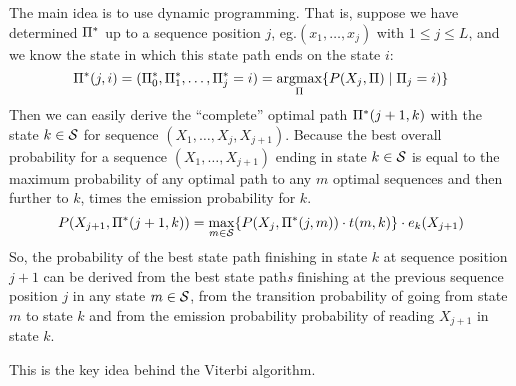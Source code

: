 The main idea is to use dynamic programming.  That is, suppose we have
determined \(\Pi^*\) up to a sequence position \(j\), eg.\@ \((x_1,\dotsc,x_j)\)
with \(1\leq j\leq L\), and we know the state in which this state path ends on
the state \(i\):
\[
    \Pi^*(j,i) = (\Pi_0^*, \Pi_1^*, \dotsc, \Pi_j^* = i)
                 = \operatorname*{argmax}_{\Pi} \{ P(X_j,\Pi) \mid \Pi_j = i) \}
\]
Then we can easily derive the \enquote{complete} optimal path \(\Pi^*(j+1,k)\)
with the state \(k\in\mathcal{S}\) for sequence \((X_1,\dotsc,X_j,X_{j+1})\).
Because the best overall probability for a sequence \((X_1,\dotsc,X_{j+1})\)
ending in state \(k\in\mathcal{S}\) is equal to the maximum probability of any
optimal path to any \(m\) optimal sequences and then further to \(k\), times the
emission probability for \(k\).
\[
    P(X_{j+1}, \Pi^*(j+1,k))
  = \max_{m\in\mathcal{S}} \{ P(X_j,\Pi^*(j,m)) \cdot t(m,k) \} \cdot e_k(X_{j+1})
\]
So, the probability of the best state path finishing in state \(k\) at sequence
position \(j+1\) can be derived from the best state path\emph{s} finishing at
the previous sequence position \(j\) in any state \(m\in\mathcal{S}\), from the
transition probability of going from state \(m\) to state \(k\) and from the
emission probability probability of reading \(X_{j+1}\) in state \(k\).

This is the key idea behind the Viterbi algorithm.

